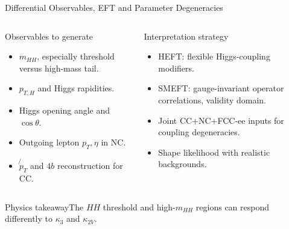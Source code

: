 \documentclass[aspectratio=1610,english]{beamer}
\newcommand{\src}[1]{\vfill{\par\color{black!65}\fontsize{6.4}{7.4}\selectfont\emph{Source:} #1\par}}
\newcommand{\key}[1]{\begin{alertblock}{Physics takeaway}\scriptsize #1\end{alertblock}}
\begin{document}
\begin{frame}[t]{Differential Observables, EFT and Parameter Degeneracies}
\small

\begin{columns}%
\begin{block}{Observables to generate}
\begin{itemize}\item $m_{HH}$, especially threshold versus high-mass tail.
\item $p_{T,H}$ and Higgs rapidities.
\item Higgs opening angle and $\cos\theta$.
\item Outgoing lepton $p_T,\eta$ in NC.
\item $\not{p}_T$ and $4b$ reconstruction for CC.
\end{itemize}\end{block}
\begin{alertblock}{Interpretation strategy}
\begin{itemize}\item HEFT: flexible Higgs-coupling modifiers.
\item SMEFT: gauge-invariant operator correlations, validity domain.
\item Joint CC+NC+FCC-ee inputs for coupling degeneracies.
\item Shape likelihood with realistic backgrounds.
\end{itemize}\end{alertblock}
\end{columns}
\key{The $HH$ threshold and high-$m_{HH}$ regions can respond differently to $\kappa_3$ and $\kappa_{2V}$.}

\end{frame}
\end{document}
